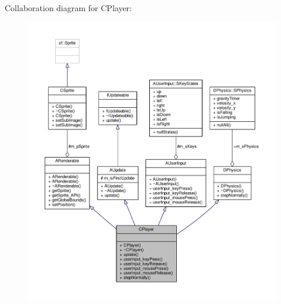 Collaboration diagram for C\-Player\-:
\nopagebreak
\begin{figure}[H]
\begin{center}
\leavevmode
\includegraphics[width=350pt]{classCPlayer__coll__graph}
\end{center}
\end{figure}
